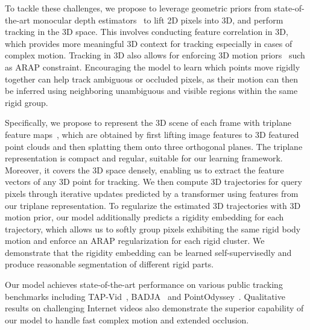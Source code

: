 To tackle these challenges, we propose to leverage geometric priors from state-of-the-art monocular depth estimators~\cite{ZoeDepth} to lift 2D pixels into 3D, and perform tracking in the 3D space. This involves conducting feature correlation in 3D, which provides more meaningful 3D context for tracking especially in cases of complex motion.
Tracking in 3D also allows for enforcing 3D motion priors~\cite{raft3D,quiroga2014dense} such as ARAP constraint.
Encouraging the model to learn which points move rigidly together can help track ambiguous or occluded pixels, as their motion can then be inferred using neighboring unambiguous and visible regions within the same rigid group.

Specifically, we propose to represent the 3D scene of each frame with triplane feature maps~\cite{chan2022efficient}, which are obtained by first lifting image features to 3D featured point clouds and then splatting them onto three orthogonal planes.
The triplane representation is compact and regular, suitable for our learning framework.
Moreover, it covers the 3D space densely, enabling us to extract the feature vectors of any 3D point for tracking. We then compute 3D trajectories for query pixels through iterative updates predicted by a transformer using features from our triplane representation.
To regularize the estimated 3D trajectories with 3D motion prior, our model additionally predicts a rigidity embedding for each trajectory, which allows us to softly group pixels exhibiting the same rigid body motion and enforce an ARAP regularization for each rigid cluster.
We demonstrate that the rigidity embedding can be learned self-supervisedly and produce reasonable segmentation of different rigid parts.

Our model achieves state-of-the-art performance on various public tracking benchmarks including TAP-Vid~\cite{tap-vid}, BADJA~\cite{BADJA} and 
PointOdyssey~\cite{zheng2023pointodyssey}. Qualitative results on challenging Internet videos also demonstrate the superior capability of our model to handle fast complex motion and extended occlusion. 

